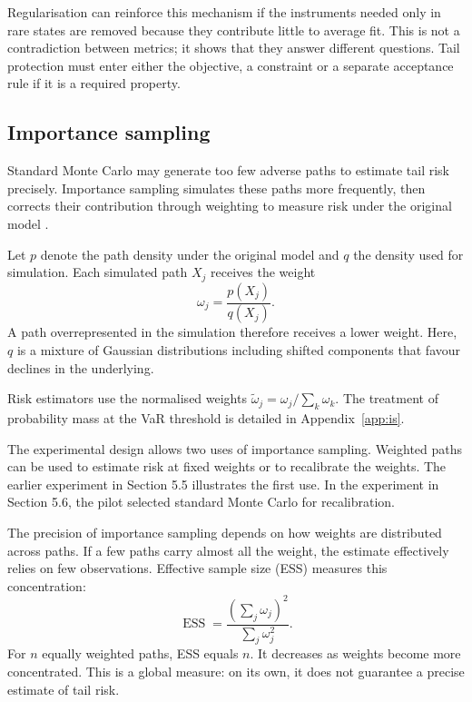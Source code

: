 \documentclass[12pt,a4paper]{article}
\newcommand{\1}{\mathbf{1}}
\begin{document}
Regularisation can reinforce this mechanism if the instruments needed only in
rare states are removed because they contribute little to average fit. This is
not a contradiction between metrics; it shows that they answer different
questions. Tail protection must enter either the objective, a constraint or a
separate acceptance rule if it is a required property.

\subsection{Importance sampling}

Standard Monte Carlo may generate too few adverse paths to estimate tail risk precisely. Importance sampling simulates these paths more frequently, then corrects their contribution through weighting to measure risk under the original model \cite{glasserman2004}.

Let $p$ denote the path density under the original model and $q$ the density used for simulation. Each simulated path $X_j$ receives the weight
\begin{equation}
 \omega_j=\frac{p(X_j)}{q(X_j)}.
\label{eq:likelihood-ratio}
\end{equation}
A path overrepresented in the simulation therefore receives a lower weight. Here, $q$ is a mixture of Gaussian distributions including shifted components that favour declines in the underlying.

Risk estimators use the normalised weights $\widetilde{\omega}_j=\omega_j/\sum_k\omega_k$. The treatment of probability mass at the VaR threshold is detailed in Appendix~\ref{app:is}.

The experimental design allows two uses of importance sampling. Weighted paths can be used to estimate risk at fixed weights or to recalibrate the weights. The earlier experiment in Section 5.5 illustrates the first use. In the experiment in Section 5.6, the pilot selected standard Monte Carlo for recalibration.

The precision of importance sampling depends on how weights are distributed across paths. If a few paths carry almost all the weight, the estimate effectively relies on few observations. Effective sample size (ESS) measures this concentration:
\begin{equation}
 \operatorname{ESS}=\frac{(\sum_j\omega_j)^2}{\sum_j\omega_j^2}.
\label{eq:ess}
\end{equation}
For $n$ equally weighted paths, ESS equals $n$. It decreases as weights become more concentrated. This is a global measure: on its own, it does not guarantee a precise estimate of tail risk.
\end{document}
